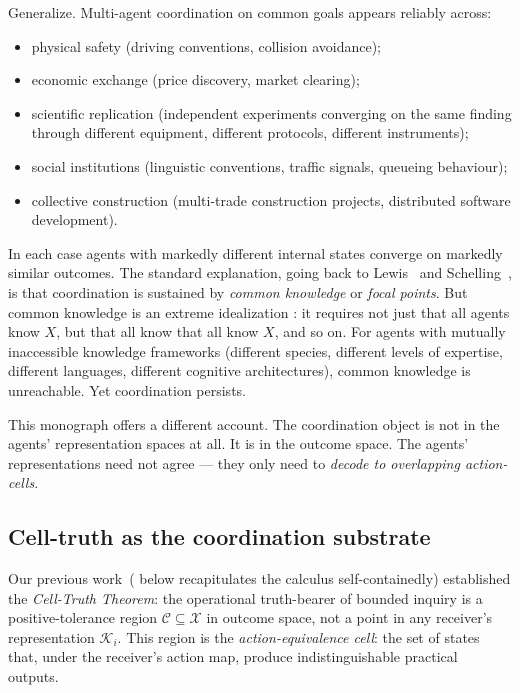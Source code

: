 \documentclass[11pt,twocolumn,a4paper]{article}
\newcommand{\K}{\mathcal{K}}
\newcommand{\X}{\mathcal{X}}
\newcommand{\Cell}{\mathcal{C}}
\begin{document}
Generalize. Multi-agent coordination on common goals appears reliably
across:
\begin{itemize}[leftmargin=*]
\item physical safety (driving conventions, collision avoidance);
\item economic exchange (price discovery, market clearing);
\item scientific replication (independent experiments converging on the
same finding through different equipment, different protocols, different
instruments);
\item social institutions (linguistic conventions, traffic signals,
queueing behaviour);
\item collective construction (multi-trade construction projects,
distributed software development).
\end{itemize}
In each case agents with markedly different internal states converge on
markedly similar outcomes. The standard explanation, going back to
Lewis~\cite{lewis1969} and Schelling~\cite{schelling1960}, is that
coordination is sustained by \emph{common knowledge} or \emph{focal
points}. But common knowledge is an extreme idealization
\cite{aumann1976,fagin1995}: it requires not just that all agents know
$X$, but that all know that all know $X$, and so on. For agents with
mutually inaccessible knowledge frameworks (different species, different
levels of expertise, different languages, different cognitive
architectures), common knowledge is unreachable. Yet coordination
persists.

This monograph offers a different account. The coordination object is
not in the agents' representation spaces at all. It is in the outcome
space. The agents' representations need not agree --- they only need to
\emph{decode to overlapping action-cells}.

\subsection{Cell-truth as the coordination substrate}

Our previous work~( below recapitulates the
calculus self-containedly) established the \emph{Cell-Truth Theorem}:
the operational truth-bearer of bounded inquiry is a positive-tolerance
region $\Cell\subseteq\X$ in outcome space, not a point in any receiver's
representation $\K_i$. This region is the
\emph{action-equivalence cell}: the set of states that, under the
receiver's action map, produce indistinguishable practical outputs.
\end{document}
